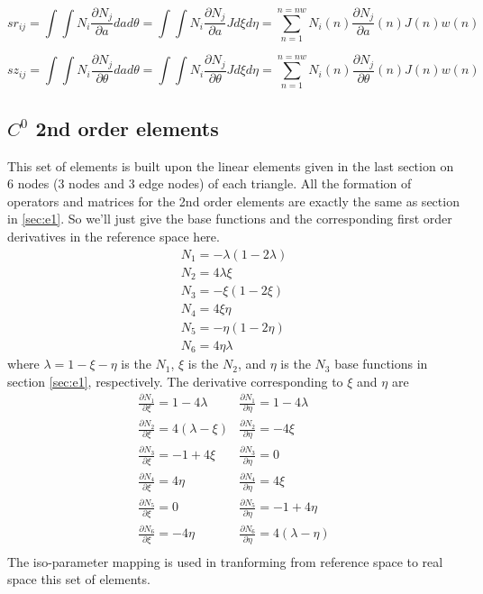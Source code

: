 \documentclass{report}
\newcommand{\pp}[2]{\frac{\partial{#1}}{\partial{#2}}}
\begin{document}
$$
sr_{ij} = \int\int N_i \pp{N_j}{a} dad\theta
        = \int\int N_i \pp{N_j}{a} J d\xi d\eta
        = \sum_{n=1}^{n=nw} N_i(n) \pp{N_j}{a}(n) J(n) w(n)
$$

$$
sz_{ij} = \int\int N_i \pp{N_j}{\theta} dad\theta
        = \int\int N_i \pp{N_j}{\theta} J d\xi d\eta
        = \sum_{n=1}^{n=nw} N_i(n) \pp{N_j}{\theta}(n) J(n) w(n)
$$



\subsection{$C^0$ 2nd order elements}
\label{sec:e2}
This set of elements is built upon the linear elements given in the last section
on $6$ nodes (3 nodes and 3 edge nodes) of each triangle.
All the formation of operators and matrices for the 2nd order elements
are exactly the same as section in \ref{sec:e1}.
So we'll just give the base functions and the corresponding first order
derivatives in the reference space here.
\begin{equation}
\begin{array}{l}
N_1 = - \lambda (1 - 2\lambda) \\
N_2 = 4 \lambda \xi \\
N_3 = - \xi ( 1 - 2\xi) \\
N_4 = 4 \xi \eta \\
N_5 = - \eta (1 - 2\eta) \\
N_6 = 4 \eta \lambda
\end{array}
\end{equation}
where $\lambda=1-\xi-\eta$ is the $N_1$, $\xi$ is the $N_2$,
and $\eta$ is the $N_3$ base functions in section \ref{sec:e1},
respectively.
The derivative corresponding to $\xi$ and $\eta$ are
\begin{equation}
\begin{array}{ll}
\pp{N_1}{\xi} = 1-4\lambda   &  \pp{N_1}{\eta} = 1-4\lambda \\
\pp{N_2}{\xi} = 4(\lambda-\xi)    &  \pp{N_2}{\eta} = -4\xi \\
\pp{N_3}{\xi} = -1+4\xi    &  \pp{N_3}{\eta} = 0 \\
\pp{N_4}{\xi} = 4\eta    &  \pp{N_4}{\eta} = 4\xi \\
\pp{N_5}{\xi} = 0    &  \pp{N_5}{\eta} = -1+4\eta \\
\pp{N_6}{\xi} = -4\eta    &  \pp{N_6}{\eta} = 4(\lambda-\eta) \\
\end{array}
\end{equation}
The iso-parameter mapping is used in tranforming from reference space
to real space this set of elements.
\end{document}
